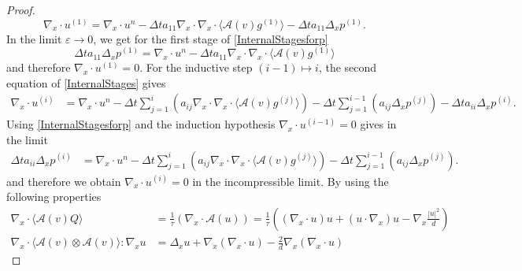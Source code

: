 \documentclass[final,11pt]{siamart251216}
\numberwithin{equation}{section}
\theoremstyle{definition}
\theoremstyle{remark}
\begin{document}
\begin{proof}
\begin{equation} \label{SecondProofReference}
\nabla_x \cdot u^{(1)} = \nabla_x \cdot u^n - \Delta t  a_{11} \nabla_x \cdot \nabla_x \cdot \langle \mathcal{A}(v) g^{(1)} \rangle
- \Delta t a_{11} \Delta_x p^{(1)}.
\end{equation}
In the limit $\varepsilon \to 0$, we get for the first stage of \eqref{InternalStagesforp}
\begin{equation}
\Delta t a_{11} \Delta_x p^{(1)} =  \nabla_x \cdot u^n - \Delta t  a_{11} \nabla_x \cdot \nabla_x \cdot \langle \mathcal{A}(v) g^{(1)} \rangle
\end{equation}
and therefore $\nabla_x \cdot u^{(1)} = 0$.
For the inductive step $(i-1) \mapsto i$, the second equation of \eqref{InternalStages} gives
\begin{equation}
\begin{split}
\nabla_x \cdot u^{(i)} &= \nabla_x \cdot u^n 
- \Delta t  \sum_{j = 1}^i \left( a_{ij} \nabla_x \cdot \nabla_x \cdot \langle \mathcal{A}(v) g^{(j)} \rangle \right) - \Delta t  \sum_{j = 1}^{i-1} \left( a_{ij} \Delta_x p^{(j)} \right) 
- \Delta t  a_{ii} \Delta_x p^{(i)}.
\end{split}
\end{equation}
Using \eqref{InternalStagesforp} and the induction hypothesis $\nabla_x \cdot u^{(i-1)} = 0$ gives in the limit 
\begin{equation}
\begin{split}
\Delta t a_{ii} \Delta_x p^{(i)}  &= \nabla_x \cdot  u^n - \Delta t  \sum_{j = 1}^i \left( a_{ij} \nabla_x \cdot \nabla_x \cdot \langle \mathcal{A}(v) g^{(j)} \rangle \right) - \Delta t  \sum_{j = 1}^{i-1} \left( a_{ij} \Delta_x p^{(j)} \right).
\end{split}
\end{equation}
and therefore we obtain $\nabla_x \cdot u^{(i)} = 0$ in the incompressible limit.
By using the following properties
\begin{equation*}\begin{split}
\nabla_x \cdot \langle \mathcal{A}(v) Q \rangle &= \frac{1}{\tau}\left( \nabla_x \cdot \mathcal{A}(u)\right) = \frac{1}{\tau} \left((\nabla_x \cdot u) u + (u \cdot \nabla_x) u - \nabla_x \frac{|u|^2}{d} \right)\\
\nabla_x \cdot \langle \mathcal{A}(v) \otimes \mathcal{A}(v) \rangle : \nabla_x u &= \Delta_x u + \nabla_x(\nabla_x \cdot u) - \frac{2}{d} \nabla_x (\nabla_x \cdot u)
\end{split}
\end{equation*}

\end{proof}
\end{document}
